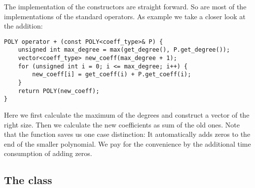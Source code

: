 The implementation of the constructors are straight forward. So are most of the implementations of the standard operators. As example we take a closer look at the addition:
\begin{lstlisting}
POLY operator + (const POLY<coeff_type>& P) {
	unsigned int max_degree = max(get_degree(), P.get_degree());
	vector<coeff_type> new_coeff(max_degree + 1);
	for (unsigned int i = 0; i <= max_degree; i++) {
		new_coeff[i] = get_coeff(i) + P.get_coeff(i);
	}
	return POLY(new_coeff);
}
\end{lstlisting}
Here we first calculate the maximum of the degrees and construct a vector of the right size. Then we calculate the new coefficients as sum of the old ones. Note that the function  saves us one case distinction: It automatically adds zeros to the end of the smaller polynomial. We pay for the convenience by the additional time consumption of adding zeros.

\subsection{The class }

